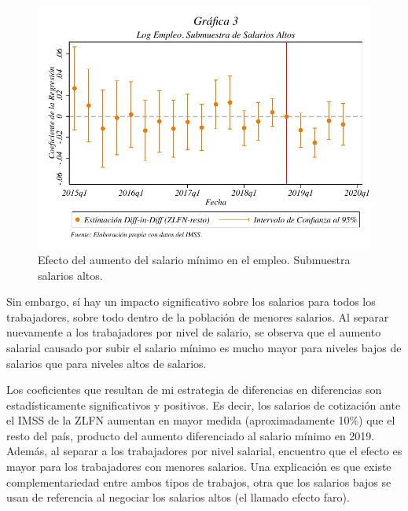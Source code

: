 \begin{figure}[H]

\includegraphics[width=\textwidth]{Figures/LogEmpleo_SalariosAltos.pdf}
\caption{Efecto del aumento del salario mínimo en el empleo. Submuestra salarios altos.}
\label{fig:3}
\end{figure}

Sin embargo, sí hay un impacto significativo sobre los salarios para todos los trabajadores, sobre todo dentro de la población de menores salarios. Al separar nuevamente a los trabajadores por nivel de salario, se observa que el aumento salarial causado por subir el salario mínimo es mucho mayor para niveles bajos de salarios que para niveles altos de salarios.

Los coeficientes que resultan de mi estrategia de diferencias en diferencias son estadísticamente significativos y positivos. Es decir, los salarios de cotización ante el IMSS de la ZLFN aumentan en mayor medida (aproximadamente 10\%) que el resto del país, producto del aumento diferenciado al salario mínimo en 2019. Además, al separar a los trabajadores por nivel salarial, encuentro que el efecto es mayor  para los trabajadores con menores salarios. Una explicación es que existe complementariedad entre ambos tipos de trabajos, otra que los salarios bajos se usan de referencia al negociar los salarios altos (el llamado efecto faro).

